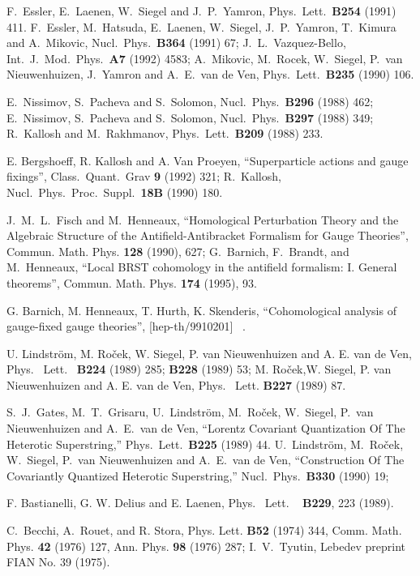 \documentclass[a4paper,12pt]{article}
\begin{document}
\begin{thebibliography}{99}
  F.~Essler, E.~Laenen, W.~Siegel and J.~P.~Yamron, Phys.\ Lett.\
  {\bf B254} (1991) 411. 
  F.~Essler, M.~Hatsuda, E.~Laenen, W.~Siegel, J.~P.~Yamron, T.~Kimura
  and A.~Mikovic, 
  Nucl.\ Phys.\  {\bf B364} (1991) 67; J.~L.~Vazquez-Bello,
  Int.\ J.\ Mod.\ Phys.\  {\bf A7} (1992) 4583;
  A.~Mikovic, M.~Rocek, W.~Siegel, P.~van Nieuwenhuizen, J.~Yamron and
  A.~E.~van de Ven, 
  Phys.\ Lett.\  {\bf B235} (1990) 106.

E.~Nissimov, S.~Pacheva and S.~Solomon,
Nucl.\ Phys.\  {\bf B296} (1988) 462; E.~Nissimov, S.~Pacheva and S.~Solomon, 
Nucl.\ Phys.\  {\bf B297} (1988) 349;
R.~Kallosh and M.~Rakhmanov, Phys.\ Lett.\  {\bf B209} (1988) 233.

  E. Bergshoeff, R. Kallosh and A. Van Proeyen, ``Superparticle
  actions and gauge fixings'', Class.\ Quant.\ Grav {\bf 9}
  (1992) 321; R.~Kallosh, Nucl.\ Phys.\ Proc.\ Suppl.\  {\bf 18B}
  (1990) 180.

  J.~M.~L.~Fisch and M.~Henneaux, ``Homological Perturbation Theory
  and the Algebraic Structure of the Antifield-Antibracket Formalism
  for Gauge Theories'', Commun. Math. Phys. {\bf 128} (1990), 627;
  G.~Barnich, F.~Brandt, and M.~Henneaux, ``Local BRST cohomology in
  the antifield formalism: I. General theorems'',
  Commun. Math. Phys. {\bf 174} (1995), 93.


  G. Barnich, M. Henneaux, T. Hurth, K. Skenderis, ``Cohomological
  analysis of gauge-fixed gauge theories'', [hep-th/9910201] \, .
 

  U. Lindstr\"om, M. Ro\v cek, W. Siegel, P. van Nieuwenhuizen and
  A. E. van de Ven, Phys. \ Lett. \ {\bf B224} (1989) 285; {\bf
    B228} (1989) 53; M. Ro\v cek,W. Siegel, P. van Nieuwenhuizen and
  A. E. van de Ven, Phys. \ Lett. {\bf B227} (1989) 87. 

S.~J.~Gates, M.~T.~Grisaru, U.~Lindstr\"om, M.~Ro\v cek, W.~Siegel, 
P.~van Nieuwenhuizen and A.~E.~van de Ven,
``Lorentz Covariant Quantization Of The Heterotic Superstring,''
Phys.\ Lett.\  {\bf B225} (1989) 44.
U.~Lindstr\"om, M.~Ro\v cek, W.~Siegel, P.~van Nieuwenhuizen and
A.~E.~van de Ven, 
``Construction Of The Covariantly Quantized Heterotic Superstring,''
Nucl.\ Phys.\  {\bf B330} (1990) 19; 

  F. Bastianelli, G. W. Delius and E. Laenen, Phys. \ Lett. \ {\bf
  B229}, 223 (1989). 

 C.~Becchi, A.~Rouet, and R. Stora, Phys. Lett. {\bf B52} (1974) 344,
 Comm. Math. Phys. {\bf 42} (1976) 127,  
Ann. Phys. {\bf 98} (1976) 287; I.~V.~Tyutin, Lebedev preprint FIAN
No. 39 (1975).  


\end{thebibliography}
\end{document}
